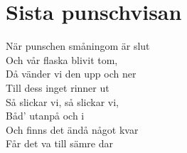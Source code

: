\section{Sista punschvisan}
När punschen småningom är slut\\
Och vår flaska blivit tom,\\
Då vänder vi den upp och ner\\
Till dess inget rinner ut\\
Så slickar vi, så slickar vi,\\
Båd’ utanpå och i\\
Och finns det ändå något kvar\\
Får det va till sämre dar\\
